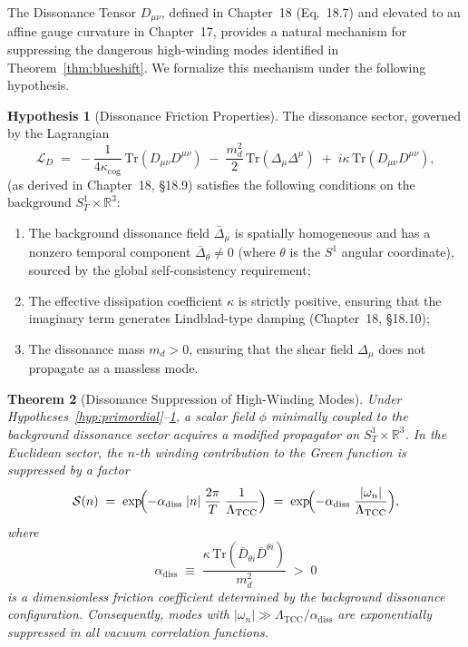 \documentclass[12pt,openany]{book}
\theoremstyle{plain}
\newtheorem{efttheorem}{Theorem}[chapter]
\theoremstyle{definition}
\newtheorem{efthypothesis}[efttheorem]{Hypothesis}
\theoremstyle{remark}
\providecommand{\Ltcc}{\Lambda_{\mathrm{TCC}}}
\providecommand{\kcog}{\kappa_{\mathrm{cog}}}
\providecommand{\abs}[1]{\lvert #1 \rvert}
\providecommand{\diss}{\mathrm{diss}}
\providecommand{\SoneR}{S^{1}_{T}\!\times\!\mathbb{R}^{3}}
\begin{document}
The Dissonance Tensor $D_{\mu\nu}$, defined in Chapter~18
(Eq.~18.7) and elevated to an affine gauge curvature in Chapter~17,
provides a natural mechanism for suppressing the dangerous high-winding
modes identified in Theorem~\ref{thm:blueshift}.  We formalize this
mechanism under the following hypothesis.

\begin{efthypothesis}[Dissonance Friction Properties]
\label{hyp:diss-props}
The dissonance sector, governed by the Lagrangian
\begin{equation}\label{eq:eft-Ldiss}
  \mathcal{L}_{D}
  \;=\;
  -\frac{1}{4\kcog}\,\mathrm{Tr}(D_{\mu\nu}D^{\mu\nu})
  \;-\;\frac{m_{d}^{2}}{2}\,\mathrm{Tr}(\Delta_{\mu}\Delta^{\mu})
  \;+\;i\kappa\,\mathrm{Tr}(D_{\mu\nu}D^{\mu\nu}),
\end{equation}
(as derived in Chapter~18, \S18.9) satisfies the following conditions
on the background $\SoneR$:
\begin{enumerate}
  \item[\textbf{(D1)}] The background dissonance field
    $\bar{\Delta}_{\mu}$ is spatially homogeneous and has a nonzero
    temporal component
    $\bar{\Delta}_{\theta} \neq 0$ (where $\theta$ is the $S^1$
    angular coordinate), sourced by the global self-consistency
    requirement;
  \item[\textbf{(D2)}] The effective dissipation coefficient $\kappa$
    is strictly positive, ensuring that the imaginary term generates
    Lindblad-type damping (Chapter~18, \S18.10);
  \item[\textbf{(D3)}] The dissonance mass $m_{d} > 0$, ensuring that
    the shear field $\Delta_{\mu}$ does not propagate as a massless
    mode.
\end{enumerate}
\end{efthypothesis}

\begin{efttheorem}[Dissonance Suppression of High-Winding Modes]
\label{thm:diss-supp}
Under Hypotheses~\ref{hyp:primordial}--\ref{hyp:diss-props}, a scalar
field $\phi$ minimally coupled to the background dissonance sector
acquires a modified propagator on $\SoneR$.  In the Euclidean
sector, the $n$-th winding contribution to the Green function is
suppressed by a factor
\begin{equation}\label{eq:eft-supp-factor}
  \mathcal{S}(n)
  \;=\;
  \exp\!\Bigl(
    -\alpha_{\diss}\;\abs{n}\;
    \frac{2\pi}{T}\;\frac{1}{\Ltcc}
  \Bigr)
  \;=\;
  \exp\!\Bigl(
    -\alpha_{\diss}\;\frac{\abs{\omega_n}}{\Ltcc}
  \Bigr),
\end{equation}
where
\begin{equation}\label{eq:eft-alpha-diss}
  \alpha_{\diss}
  \;\equiv\;
  \frac{\kappa\,\mathrm{Tr}
    (\bar{D}_{\theta i}\bar{D}^{\theta i})}
    {m_{d}^{2}}
  \;>\; 0
\end{equation}
is a dimensionless friction coefficient determined by the background
dissonance configuration.  Consequently, modes with
$\abs{\omega_n} \gg \Ltcc / \alpha_{\diss}$ are exponentially
suppressed in all vacuum correlation functions.
\end{efttheorem}
\end{document}

